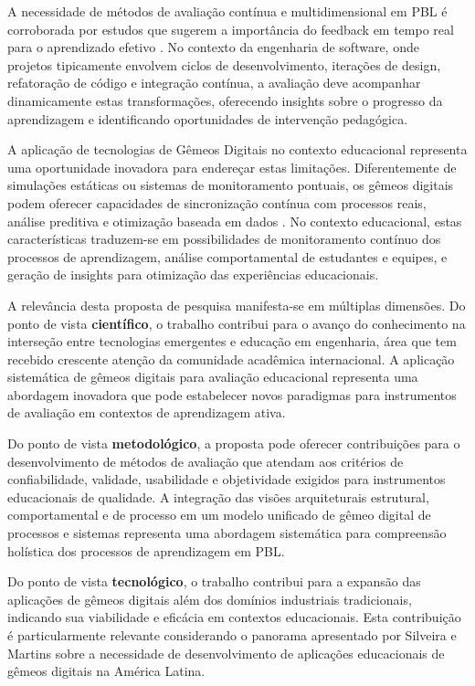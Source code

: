 \documentclass[12pt,a4paper]{article}
\renewcommand{\cite}[1]{}
\begin{document}
A necessidade de métodos de avaliação contínua e multidimensional em PBL é
corroborada por estudos que sugerem a importância do feedback em tempo real
para o aprendizado efetivo \cite{thomas2000}. No contexto da engenharia de
software, onde projetos tipicamente envolvem ciclos de desenvolvimento,
iterações de design, refatoração de código e integração contínua, a avaliação
deve acompanhar dinamicamente estas transformações, oferecendo insights sobre o
progresso da aprendizagem e identificando oportunidades de intervenção
pedagógica.

A aplicação de tecnologias de Gêmeos Digitais no contexto educacional
representa uma oportunidade inovadora para endereçar estas limitações.
Diferentemente de simulações estáticas ou sistemas de monitoramento pontuais,
os gêmeos digitais podem oferecer capacidades de sincronização contínua com
processos reais, análise preditiva e otimização baseada em dados
\cite{grieves2014, tao2018}. No contexto educacional, estas características
traduzem-se em possibilidades de monitoramento contínuo dos processos de
aprendizagem, análise comportamental de estudantes e equipes, e geração de
insights para otimização das experiências educacionais.

A relevância desta proposta de pesquisa manifesta-se em múltiplas dimensões. Do
ponto de vista \textbf{científico}, o trabalho contribui para o avanço do
conhecimento na interseção entre tecnologias emergentes e educação em
engenharia, área que tem recebido crescente atenção da comunidade acadêmica
internacional. A aplicação sistemática de gêmeos digitais para avaliação
educacional representa uma abordagem inovadora que pode estabelecer novos
paradigmas para instrumentos de avaliação em contextos de aprendizagem ativa.

Do ponto de vista \textbf{metodológico}, a proposta pode oferecer contribuições
para o desenvolvimento de métodos de avaliação que atendam aos critérios de
confiabilidade, validade, usabilidade e objetividade exigidos para instrumentos
educacionais de qualidade. A integração das visões arquiteturais estrutural,
comportamental e de processo em um modelo unificado de gêmeo digital de
processos e sistemas representa uma abordagem sistemática para compreensão
holística dos processos de aprendizagem em PBL.

Do ponto de vista \textbf{tecnológico}, o trabalho contribui para a expansão
das aplicações de gêmeos digitais além dos domínios industriais tradicionais,
indicando sua viabilidade e eficácia em contextos educacionais. Esta
contribuição é particularmente relevante considerando o panorama apresentado
por Silveira e Martins \cite{silveira2024panorama} sobre a necessidade de
desenvolvimento de aplicações educacionais de gêmeos digitais na América
Latina.
\end{document}
